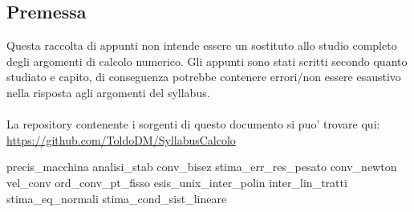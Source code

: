 \documentclass[12pt,a4paper,headings=optiontohead]{article}
\begin{document}
\begin{center}
\pagebreak

\section*{Premessa}
\begin{minipage}{0.9\textwidth} \large

Questa raccolta di appunti non intende essere un sostituto allo studio completo degli argomenti di calcolo numerico. Gli appunti sono stati scritti secondo quanto studiato e capito, di conseguenza potrebbe contenere errori/non essere esaustivo nella risposta agli argomenti del syllabus.\\\\
La repository contenente i sorgenti di questo documento si puo' trovare qui: \href{https://github.com/ToldoDM/SyllabusCalcolo}{https://github.com/ToldoDM/SyllabusCalcolo}

\end{minipage}

\end{center}
\pagebreak


\tableofcontents

\newpage
{precis_macchina}
\newpage
{analisi_stab}
{conv_bisez}
\newpage
{stima_err_res_pesato}
\newpage
{conv_newton}
\newpage
{vel_conv}
\newpage
{ord_conv_pt_fisso}
\newpage
{esis_unix_inter_polin}
\newpage
{inter_lin_tratti}
\newpage
{stima_eq_normali}
\newpage
{stima_cond_sist_lineare}
\end{document}
